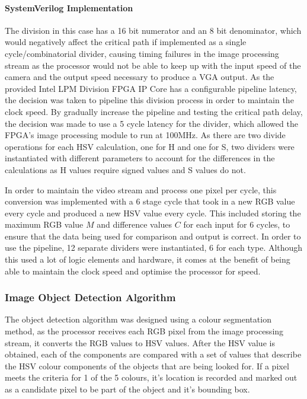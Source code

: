 \documentclass[a4paper]{article}
\begin{document}
\paragraph*{SystemVerilog Implementation} 
The division in this case has a 16 bit numerator and an 8 bit denominator, which
would negatively affect the critical path if implemented as a single cycle/combinatorial
divider, causing timing failures in the image processing stream as the processor 
would not be able to keep up with the input speed of the camera and the
output speed necessary to produce a VGA output. As the provided Intel LPM Division FPGA 
IP Core has a configurable pipeline latency, the decision was taken to pipeline this division
process in order to maintain the clock speed. By gradually increase the pipeline 
and testing the critical path delay, the decision was made to use a 5 cycle latency
for the divider, which allowed the FPGA's image processing module to run at 100MHz. As there are two divide operations for each HSV calculation, one for H and one for S,
two dividers were instantiated with different parameters to account for the differences 
in the calculations as H values require signed values and S values do not. 

In order to maintain the video stream and process one pixel per cycle, this conversion 
was implemented with a 6 stage cycle that took in a new RGB value every cycle and
produced a new HSV value every cycle. This included storing the maximum RGB value \( M \) and difference
values \(C \) for each input for 6 cycles, to ensure that the data being used for 
comparison and output is correct. In order to use the pipeline, 12 separate dividers
were instantiated, 6 for each type. Although this used a lot of logic 
elements and hardware, it comes at the benefit of being able to maintain the clock 
speed and optimise the processor for speed. 




   


\subsubsection{Image Object Detection Algorithm}

The object detection algorithm was designed using a colour segmentation method, as 
the processor receives each RGB pixel from the image processing stream, it converts the 
RGB values to HSV values. After the HSV value is obtained, each of the components 
are compared with a set of values that describe the HSV colour components of the objects 
that are being looked for. If a pixel meets the criteria for 1 of the 5 colours, it's 
location is recorded and marked out as a candidate pixel to be part of the object and 
it's bounding box. 
\end{document}
